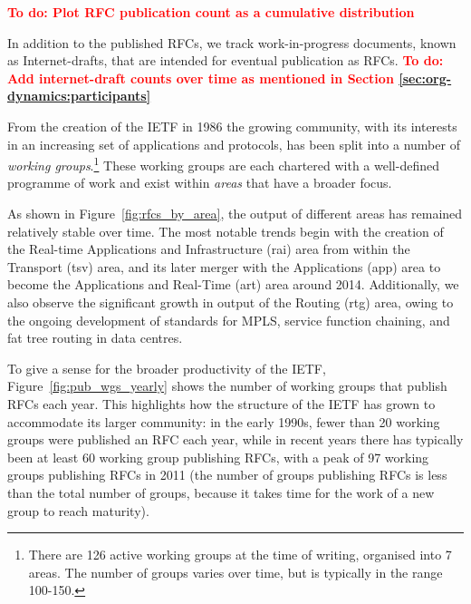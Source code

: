 \documentclass[twocolumn,10pt]{article}
\newcommand{\todo}[1]{\textbf{\textcolor{red}{To do: #1}}}
\newcommand{\pb}[1]{\vspace{0.75ex}\noindent{\textbf{#1}}}
\begin{document}
\todo{Plot RFC publication count as a cumulative distribution}

In addition to the published RFCs, we track work-in-progress documents,
known as Internet-drafts, that are intended for eventual publication as
RFCs.
\todo{Add internet-draft counts over time as mentioned in Section \ref{sec:org-dynamics:participants}}

\pb{Role of Working Groups:}
From the creation of the IETF in 1986 the growing community, with its
interests in an increasing set of applications and protocols, has been
split into a number of \emph{working groups}.\footnote{There are 126
active working groups at the time of writing, organised into 7 areas.
The number of groups varies over time, but is typically in the range
100-150.} These working groups are each chartered with a well-defined
programme of work and exist within \emph{areas} that have a broader focus.  

As shown in Figure~\ref{fig:rfcs_by_area}, the output of
different areas has remained relatively stable over time. The most notable
trends begin with the creation of the Real-time Applications and
Infrastructure (rai) area from within the Transport (tsv) area, and its
later merger with the Applications (app) area to become the Applications
and Real-Time (art) area around 2014. Additionally, we also observe the
significant growth in output of the Routing (rtg) area, owing to the
ongoing development of standards for MPLS, service function chaining, and
fat tree routing in data centres.

To give a sense for the broader productivity of the IETF,
Figure~\ref{fig:pub_wgs_yearly} shows the number of working groups that
publish RFCs each year. This highlights how the structure of the IETF has
grown to accommodate its larger community: in the early 1990s, fewer than
20 working groups were published an RFC each year, while in recent years
there has typically been at least 60 working group publishing RFCs, with
a peak of 97 working groups publishing RFCs in 2011 (the number of groups
publishing RFCs is less than the total number of groups, because it takes
time for the work of a new group to reach maturity).
\end{document}
